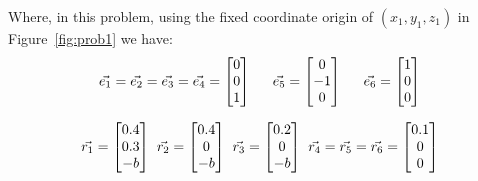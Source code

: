 \documentclass[conference]{IEEEtran}
\begin{document}
Where, in this problem, using the fixed coordinate origin of \((x_1, y_1, z_1)\) in Figure~\ref{fig:prob1} we have:
\begin{align*}
    \vec{e_1} = \vec{e_2} = \vec{e_3} =
    \vec{e_4} = \begin{bmatrix}
                    0 \\
                    0 \\
                    1
                \end{bmatrix} \hspace{15px}
    \vec{e_5} = \begin{bmatrix}
                    0  \\
                    -1 \\
                    0
                \end{bmatrix} \hspace{15px}
    \vec{e_6} = \begin{bmatrix}
                    1 \\
                    0 \\
                    0
                \end{bmatrix}
\end{align*}

\begin{align*}
    \vec{r_1} = \begin{bmatrix}
                    0.4 \\
                    0.3 \\
                    -b
                \end{bmatrix} \hspace{4px}
    \vec{r_2} = \begin{bmatrix}
                    0.4 \\
                    0   \\
                    -b
                \end{bmatrix} \hspace{4px}
    \vec{r_3} = \begin{bmatrix}
                    0.2 \\
                    0   \\
                    -b
                \end{bmatrix} \hspace{4px}
    \vec{r_4} = \vec{r_5} = \vec{r_6} = \begin{bmatrix}
                                            0.1 \\
                                            0   \\
                                            0
                                        \end{bmatrix}
\end{align*}
\end{document}

